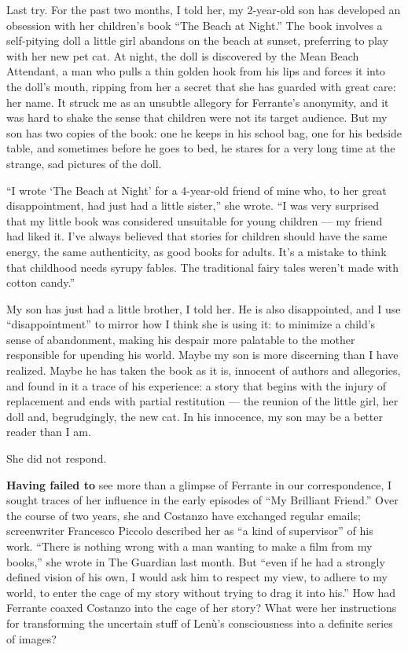 Last try. For the past two months, I told her, my 2-year-old son has
developed an obsession with her children's book ``The Beach at Night.''
The book involves a self-pitying doll a little girl abandons on the
beach at sunset, preferring to play with her new pet cat. At night, the
doll is discovered by the Mean Beach Attendant, a man who pulls a thin
golden hook from his lips and forces it into the doll's mouth, ripping
from her a secret that she has guarded with great care: her name. It
struck me as an unsubtle allegory for Ferrante's anonymity, and it was
hard to shake the sense that children were not its target audience. But
my son has two copies of the book: one he keeps in his school bag, one
for his bedside table, and sometimes before he goes to bed, he stares
for a very long time at the strange, sad pictures of the doll.

``I wrote `The Beach at Night' for a 4-year-old friend of mine who, to
her great disappointment, had just had a little sister,'' she wrote. ``I
was very surprised that my little book was considered unsuitable for
young children --- my friend had liked it. I've always believed that
stories for children should have the same energy, the same authenticity,
as good books for adults. It's a mistake to think that childhood needs
syrupy fables. The traditional fairy tales weren't made with cotton
candy.''

My son has just had a little brother, I told her. He is also
disappointed, and I use ``disappointment'' to mirror how I think she is
using it: to minimize a child's sense of abandonment, making his despair
more palatable to the mother responsible for upending his world. Maybe
my son is more discerning than I have realized. Maybe he has taken the
book as it is, innocent of authors and allegories, and found in it a
trace of his experience: a story that begins with the injury of
replacement and ends with partial restitution --- the reunion of the
little girl, her doll and, begrudgingly, the new cat. In his innocence,
my son may be a better reader than I am.

She did not respond.

\textbf{Having failed to} see more than a glimpse of Ferrante in our
correspondence, I sought traces of her influence in the early episodes
of ``My Brilliant Friend.'' Over the course of two years, she and
Costanzo have exchanged regular emails; screenwriter Francesco Piccolo
described her as ``a kind of supervisor'' of his work. ``There is
nothing wrong with a man wanting to make a film from my books,'' she
wrote in The Guardian last month. But ``even if he had a strongly
defined vision of his own, I would ask him to respect my view, to adhere
to my world, to enter the cage of my story without trying to drag it
into his.'' How had Ferrante coaxed Costanzo into the cage of her story?
What were her instructions for transforming the uncertain stuff of
Lenù's consciousness into a definite series of images?

